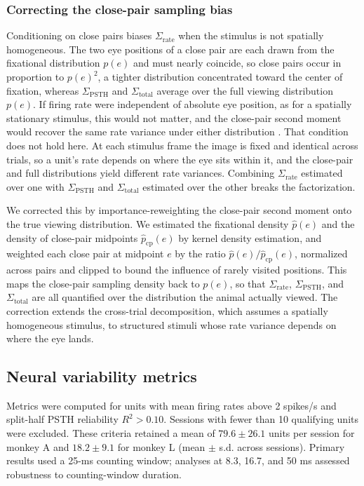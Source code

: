 \documentclass{lite}
\newcommand{\Cpsth}{\Sigma_{\text{PSTH}}}
\newcommand{\Ctotal}{\Sigma_{\text{total}}}
\newcommand{\Crate}{\Sigma_{\text{rate}}}
\begin{document}
\subsubsection{Correcting the close-pair sampling bias}
Conditioning on close pairs biases $\Crate$ when the stimulus is not spatially homogeneous. The two eye positions of a close pair are each drawn from the fixational distribution $p(e)$ and must nearly coincide, so close pairs occur in proportion to $p(e)^2$, a tighter distribution concentrated toward the center of fixation, whereas $\Cpsth$ and $\Ctotal$ average over the full viewing distribution $p(e)$. If firing rate were independent of absolute eye position, as for a spatially stationary stimulus, this would not matter, and the close-pair second moment would recover the same rate variance under either distribution \cite{mcfarland2016variability}. That condition does not hold here. At each stimulus frame the image is fixed and identical across trials, so a unit's rate depends on where the eye sits within it, and the close-pair and full distributions yield different rate variances. Combining $\Crate$ estimated over one with $\Cpsth$ and $\Ctotal$ estimated over the other breaks the factorization.

We corrected this by importance-reweighting the close-pair second moment onto the true viewing distribution. We estimated the fixational density $\hat{p}(e)$ and the density of close-pair midpoints $\hat{p}_{\text{cp}}(e)$ by kernel density estimation, and weighted each close pair at midpoint $e$ by the ratio $\hat{p}(e) / \hat{p}_{\text{cp}}(e)$, normalized across pairs and clipped to bound the influence of rarely visited positions. This maps the close-pair sampling density back to $p(e)$, so that $\Crate$, $\Cpsth$, and $\Ctotal$ are all quantified over the distribution the animal actually viewed. The correction extends the cross-trial decomposition, which assumes a spatially homogeneous stimulus, to structured stimuli whose rate variance depends on where the eye lands.

\subsection{Neural variability metrics}
Metrics were computed for units with mean firing rates above 2 spikes/s and split-half PSTH reliability $R^2 > 0.10$. Sessions with fewer than 10 qualifying units were excluded. These criteria retained a mean of $79.6 \pm 26.1$ units per session for monkey A and $18.2 \pm 9.1$ for monkey L (mean $\pm$ s.d. across sessions). Primary results used a 25-ms counting window; analyses at 8.3, 16.7, and 50 ms assessed robustness to counting-window duration.
\end{document}
